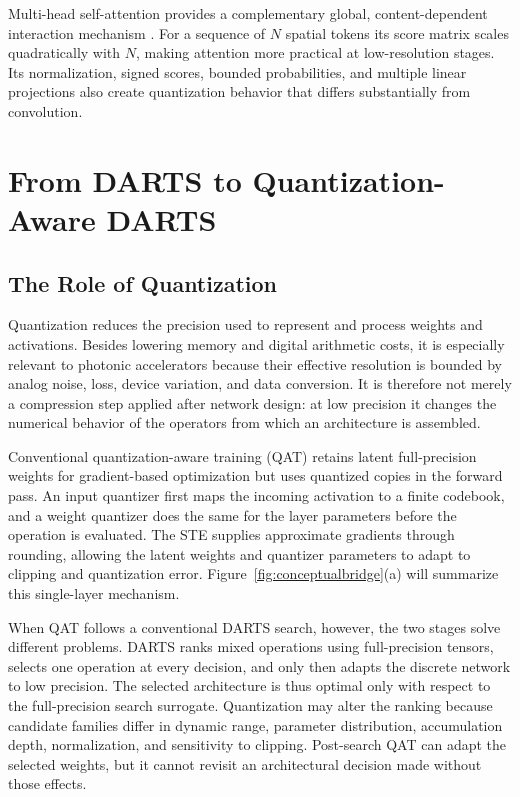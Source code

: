 \documentclass[lettersize,journal]{IEEEtran}
\begin{document}
Multi-head self-attention provides a complementary global, content-dependent interaction mechanism \cite{vaswani2017attention}. For a sequence of $N$ spatial tokens its score matrix scales quadratically with $N$, making attention more practical at low-resolution stages. Its normalization, signed scores, bounded probabilities, and multiple linear projections also create quantization behavior that differs substantially from convolution.

\section{From DARTS to Quantization-Aware DARTS}
\label{sec:role}
\subsection{The Role of Quantization}
Quantization reduces the precision used to represent and process weights and activations. Besides lowering memory and digital arithmetic costs, it is especially relevant to photonic accelerators because their effective resolution is bounded by analog noise, loss, device variation, and data conversion. It is therefore not merely a compression step applied after network design: at low precision it changes the numerical behavior of the operators from which an architecture is assembled.

Conventional quantization-aware training (QAT) retains latent full-precision weights for gradient-based optimization but uses quantized copies in the forward pass. An input quantizer first maps the incoming activation to a finite codebook, and a weight quantizer does the same for the layer parameters before the operation is evaluated. The STE supplies approximate gradients through rounding, allowing the latent weights and quantizer parameters to adapt to clipping and quantization error. Figure~\ref{fig:conceptualbridge}(a) will summarize this single-layer mechanism.

When QAT follows a conventional DARTS search, however, the two stages solve different problems. DARTS ranks mixed operations using full-precision tensors, selects one operation at every decision, and only then adapts the discrete network to low precision. The selected architecture is thus optimal only with respect to the full-precision search surrogate. Quantization may alter the ranking because candidate families differ in dynamic range, parameter distribution, accumulation depth, normalization, and sensitivity to clipping. Post-search QAT can adapt the selected weights, but it cannot revisit an architectural decision made without those effects.
\end{document}
